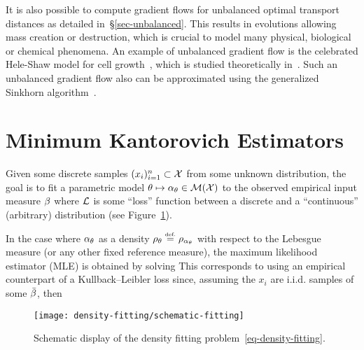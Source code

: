 It is also possible to compute gradient flows for unbalanced optimal transport distances as detailed in~\S\ref{sec-unbalanced}. This results in evolutions allowing mass creation or destruction, which is crucial to model many physical, biological or chemical phenomena. %
An example of unbalanced gradient flow is the celebrated Hele-Shaw model for cell growth~\citep{PerthameTumor}, which is studied theoretically in~\citep{gallouet2017jko,marino2017tumor}. Such an unbalanced gradient flow also can be approximated using the generalized Sinkhorn algorithm~\citep{2016-chizat-sinkhorn}.




\section{Minimum Kantorovich Estimators}
\label{sec-mke}

Given some discrete samples $(x_i)_{i=1}^n \subset \mathcal{X}$ from some unknown distribution, the goal is to fit a parametric model $\theta \mapsto \alpha_\theta \in \mathcal{M}(\mathcal{X})$ to the observed empirical input measure $\beta$
where $\mathcal{L}$ is some ``loss'' function between a discrete and a ``continuous'' (arbitrary) distribution (see Figure~\ref{fig-density-fitting}). 

In the case where $\alpha_\theta$ as a density $\density{\th} \eqdef \density{\al_\th}$ with respect to the Lebesgue measure (or any other fixed reference measure), the maximum likelihood estimator (MLE) is obtained by solving
This corresponds to using an empirical counterpart of a Kullback--Leibler loss since, assuming the $x_i$ are i.i.d. samples of some $\bar{\beta}$, then 

\begin{figure}[h!]
\centering
\texttt{[image: density-fitting/schematic-fitting]}
\caption{\label{fig-density-fitting}
Schematic display of the density fitting problem~\ref{eq-density-fitting}.
}
\end{figure}



